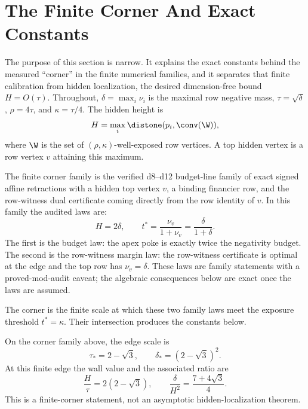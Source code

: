 \section{The Finite Corner And Exact Constants}\label{sec:corner-theorem}

The purpose of this section is narrow.  It explains the exact constants behind
the measured ``corner'' in the finite numerical families, and it separates that
finite calibration from hidden localization, the desired dimension-free bound
\(H=O(\tau)\).  Throughout, \(\delta=\max_i\nu_i\) is the maximal row negative
mass, \(\tau=\sqrt\delta\), \(\rho=4\tau\), and \(\kappa=\tau/4\).  The hidden
height is
\[
  H=\max_i \distone(p_i,\conv(\W)),
\]
where \(\W\) is the set of \((\rho,\kappa)\)-well-exposed row vertices.  A top
hidden vertex is a row vertex \(v\) attaining this maximum.

\begin{definition}
\modauditbadge
The finite corner family is the verified d8--d12 budget-line family of exact
signed affine retractions with a hidden top vertex \(v\), a binding financier
row, and the row-witness dual certificate coming directly from the row identity
of \(v\).  In this family the audited laws are:
\[
  H=2\delta,
  \qquad
  t^*=\frac{\nu_v}{1+\nu_v}=\frac{\delta}{1+\delta}.
\]
The first is the budget law: the apex poke is exactly twice the negativity
budget.  The second is the row-witness margin law: the row-witness certificate
is optimal at the edge and the top row has \(\nu_v=\delta\).  These laws are
family statements with a proved-mod-audit caveat; the algebraic consequences
below are exact once the laws are assumed.
\end{definition}

The corner is the finite scale at which these two family laws meet the exposure
threshold \(t^*=\kappa\).  Their intersection produces the constants below.

\begin{theorem}
\modauditbadge
On the corner family above, the edge scale is
\[
  \tau_* = 2-\sqrt 3,\qquad
  \delta_*=(2-\sqrt 3)^2.
\]
At this finite edge the wall value and the associated ratio are
\[
  \frac{H}{\tau}=2(2-\sqrt 3),
  \qquad
  \frac{\delta}{H^2}=\frac{7+4\sqrt 3}{4}.
\]
This is a finite-corner statement, not an asymptotic hidden-localization
theorem.
\end{theorem}

